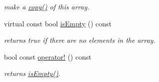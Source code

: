 \begin{DoxyCompactItemize}
\begin{DoxyCompactList}\small\item\em make a \hyperlink{classplist_1_1PointerArray_a02260685c3904a903dafabe72b03b0c1}{copy()} of this array. \end{DoxyCompactList}\item 
\hypertarget{classplist_1_1PointerArray_aa9c18f33acf5bc4887b24e4dd2fc2e20}{virtual const bool \hyperlink{classplist_1_1PointerArray_aa9c18f33acf5bc4887b24e4dd2fc2e20}{is\-Empty} () const }\label{classplist_1_1PointerArray_aa9c18f33acf5bc4887b24e4dd2fc2e20}

\begin{DoxyCompactList}\small\item\em returns true if there are no elements in the array. \end{DoxyCompactList}\item 
\hypertarget{classplist_1_1PointerArray_a1541a6bfe01ead6065e2b9dae9f7ac9b}{bool const \hyperlink{classplist_1_1PointerArray_a1541a6bfe01ead6065e2b9dae9f7ac9b}{operator!} () const }\label{classplist_1_1PointerArray_a1541a6bfe01ead6065e2b9dae9f7ac9b}

\begin{DoxyCompactList}\small\item\em returns \hyperlink{classplist_1_1PointerArray_aa9c18f33acf5bc4887b24e4dd2fc2e20}{is\-Empty()}. \end{DoxyCompactList}\end{DoxyCompactItemize}
